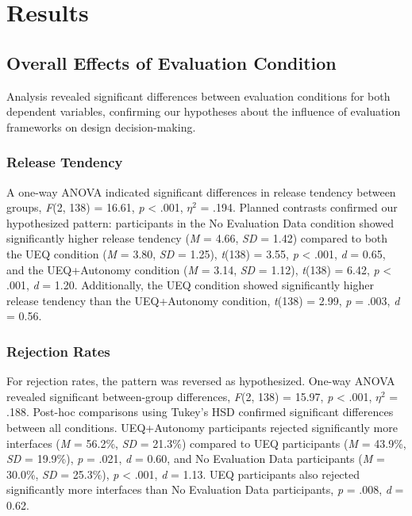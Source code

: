 
\section{Results}

\subsection{Overall Effects of Evaluation Condition}

Analysis revealed significant differences between evaluation conditions for both dependent variables, confirming our hypotheses about the influence of evaluation frameworks on design decision-making.

\subsubsection{Release Tendency}

A one-way ANOVA indicated significant differences in release tendency between groups, \textit{F}(2, 138) = 16.61, \textit{p} < .001, $\eta^2$ = .194. Planned contrasts confirmed our hypothesized pattern: participants in the No Evaluation Data condition showed significantly higher release tendency (\textit{M} = 4.66, \textit{SD} = 1.42) compared to both the UEQ condition (\textit{M} = 3.80, \textit{SD} = 1.25), \textit{t}(138) = 3.55, \textit{p} < .001, \textit{d} = 0.65, and the UEQ+Autonomy condition (\textit{M} = 3.14, \textit{SD} = 1.12), \textit{t}(138) = 6.42, \textit{p} < .001, \textit{d} = 1.20. Additionally, the UEQ condition showed significantly higher release tendency than the UEQ+Autonomy condition, \textit{t}(138) = 2.99, \textit{p} = .003, \textit{d} = 0.56.

\subsubsection{Rejection Rates}

For rejection rates, the pattern was reversed as hypothesized. One-way ANOVA revealed significant between-group differences, \textit{F}(2, 138) = 15.97, \textit{p} < .001, $\eta^2$ = .188. Post-hoc comparisons using Tukey's HSD confirmed significant differences between all conditions. UEQ+Autonomy participants rejected significantly more interfaces (\textit{M} = 56.2\%, \textit{SD} = 21.3\%) compared to UEQ participants (\textit{M} = 43.9\%, \textit{SD} = 19.9\%), \textit{p} = .021, \textit{d} = 0.60, and No Evaluation Data participants (\textit{M} = 30.0\%, \textit{SD} = 25.3\%), \textit{p} < .001, \textit{d} = 1.13. UEQ participants also rejected significantly more interfaces than No Evaluation Data participants, \textit{p} = .008, \textit{d} = 0.62.

